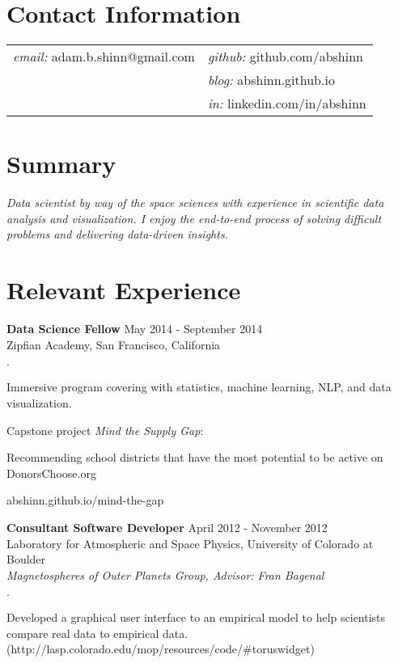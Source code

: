 \documentclass[margin,line]{res}
\newenvironment{list2}{
  \begin{list}{$\cdot$}{%
      \setlength{\itemsep}{0in}
      \setlength{\parsep}{0in} \setlength{\parskip}{0in}
      \setlength{\topsep}{0in} \setlength{\partopsep}{0in} 
      \setlength{\leftmargin}{0.2in}}}{\end{list}}
\begin{document}

\begin{resume}


\section{\sc Contact Information}

\vspace{.1 in}
\begin{tabular}{@{}p{3in}p{4in}}
{\it email:} adam.b.shinn@gmail.com & {\it github:} github.com/abshinn\\
& {\it blog:} abshinn.github.io\\
& {\it in:} linkedin.com/in/abshinn\\
\end{tabular}


\section{\sc Summary}

{\it Data scientist by way of the space sciences with experience in scientific data analysis and visualization. I enjoy the end-to-end process of solving difficult problems and delivering data-driven insights.}


\section{\sc Relevant Experience}

{\bf Data Science Fellow} \hfill {May 2014 - September 2014}\\
Zipfian Academy, San Francisco, California
\begin{list2}
\item Immersive program covering with statistics, machine learning, NLP, and data visualization.
\item Capstone project {\em Mind the Supply Gap}:
\item[] Recommending school districts that have the most potential to be active on DonorsChoose.org
\item[] abshinn.github.io/mind-the-gap
\end{list2}

{\bf Consultant Software Developer} \hfill {April 2012 - November 2012}\\
Laboratory for Atmospheric and Space Physics, University of Colorado at Boulder\\
{\em Magnetospheres of Outer Planets Group, Advisor: Fran Bagenal}
\begin{list2}
\item Developed a graphical user interface to an empirical model to help scientists compare real data to empirical data. (http://lasp.colorado.edu/mop/resources/code/\#toruswidget)
\end{list2}


\end{resume}
\end{document}
